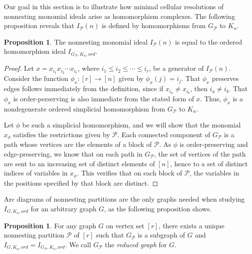 \documentclass[11pt]{amsart}
\theoremstyle{definition}
\newtheorem{proposition}[theorem]{Proposition}
\numberwithin{equation}{section}
\theoremstyle{remark}
\numberwithin{equation}{section}
\begin{document}
Our goal in this section is to illustrate how minimal cellular resolutions of nonnesting monomial ideals arise as homomorphism complexes.
The following proposition reveals that $I_{\mathcal{P}}(n)$ is defined by homomorphisms from $G_{\mathcal{P}}$ to $K_n$.

\begin{proposition}
The nonnesting monomial ideal $I_{\mathcal{P}}(n)$ is equal to the ordered homomorphism ideal $I_{G_{\mathcal{P}},K_n,ord}$.
\end{proposition}

\begin{proof}
Let $x=x_{i_1}x_{i_2} \cdots x_{i_r}$, where $i_1\leq i_2 \leq\cdots\leq i_r$, be a generator of $I_{\mathcal{P}}(n)$.
Consider the function $\phi_x:[r]\rightarrow [n]$ given by $\phi_x(j)=i_j$.
That $\phi_x$ preserves edges follows immediately from the definition, since if $x_{i_a}\neq x_{i_b}$, then $i_a\neq i_b$.
That $\phi_x$ is order-perserving is also immediate from the stated form of $x$.
Thus, $\phi_x$ is a nondegenerate ordered simplicial homomorphism from $G_{\mathcal{P}}$ to $K_n$.

Let $\phi$ be such a simplicial homomorphism, and we will show that the monomial $x_\phi$ satisfies the restrictions given by ${\mathcal{P}}$.
Each connected component of $G_{\mathcal{P}}$ is a path whose vertices are the elements of a block of ${\mathcal{P}}$.
As $\phi$ is order-preserving and edge-preserving, we know that on each path in $G_{\mathcal{P}}$, the set of vertices of the path are sent to an increasing set of distinct elements of $[n]$, hence to a set of distinct indices of variables in $x_\phi$.
This verifies that on each block of ${\mathcal{P}}$, the variables in the positions specified by that block are distinct.
\end{proof}

Arc diagrams of nonnesting partitions are the only graphs needed when studying $I_{G,K_n,ord}$ for an arbitrary graph $G$, as the following proposition shows.

\begin{proposition}\label{reducedgraph}
For any graph $G$ on vertex set $[r]$, there exists a unique nonnesting partition ${\mathcal{P}}$ of $[r]$ such that $G_{\mathcal{P}}$ is a subgraph of $G$ and $I_{G,K_n,ord}=I_{G_{\mathcal{P}},K_n,ord}$.
We call $G_{\mathcal{P}}$ the \emph{reduced graph} for $G$.
\end{proposition}
\end{document}
